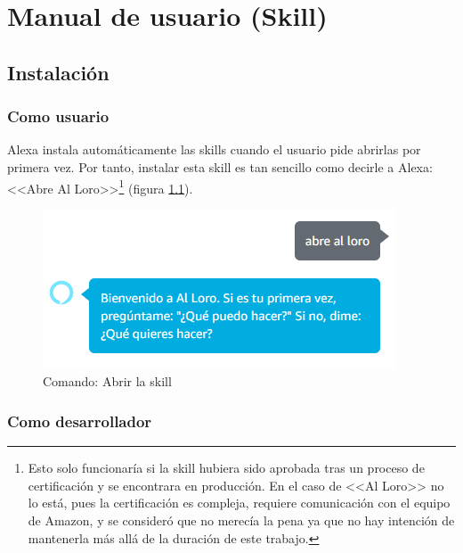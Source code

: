 \documentclass[11pt,spanish,listoffigures,listoftables,table,hyphens,dvipsnames]{tfgetsinf}
\begin{document}
\APPENDIX


\chapter{Manual de usuario (Skill)}

\section{Instalación}

\subsection{Como usuario}

Alexa instala automáticamente las skills cuando el usuario pide abrirlas por primera vez. Por tanto, instalar esta skill es tan sencillo como decirle a Alexa: <<Abre Al Loro>>\footnote{Esto solo funcionaría si la skill hubiera sido aprobada tras un proceso de certificación y se encontrara en producción. En el caso de <<Al Loro>> no lo está, pues la certificación es compleja, requiere comunicación con el equipo de Amazon, y se consideró que no merecía la pena ya que no hay intención de mantenerla más allá de la duración de este trabajo.} (figura \ref{figura:comando-abrir-skill}).

\begin{figure}[ht]
   \centering
   \includegraphics[width=\textwidth]{abrir.png}
   \caption{Comando: Abrir la skill}
   \label{figura:comando-abrir-skill}
\end{figure}

\subsection{Como desarrollador}
\end{document}
